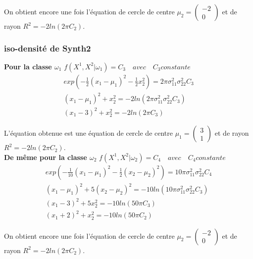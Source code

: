 \documentclass[10pt]{article}
\begin{document}
 On obtient encore une fois l'équation de cercle de centre $\mu_{2} = \begin{pmatrix} -2 \\ 0\end{pmatrix} $ et de rayon $R^{2} = -2 ln(2\pi C_{2})$.\\


\subsubsection{iso-densité de Synth2}
\textbf{Pour la classe $\omega_{1}$} $f(X^{1}, X^{2}|\omega_{1}) = C_{3} \quad avec \quad C_{3} constante$
\begin{equation}
\begin{split}
exp(-\frac{1}{2} (x_{1}-\mu_{1})^{2} - \frac{1}{2}x_{2}^{2})  = 2 \pi \sigma_{11}^{2} \sigma_{22}^{2} C_{3}
\\
(x_{1} - \mu_{1})^{2} +  x_{2}^{2} = -2ln(2 \pi \sigma_{11}^{2} \sigma_{22}^{2} C_{3})
\\
(x_{1} - 3)^{2} + x_{2}^{2} = -2 ln(2\pi C_{3})
\end{split}
\label{9}
\end{equation}

L'équation obtenue est une équation de cercle de centre $\mu_{1} = \begin{pmatrix} 3 \\ 1\end{pmatrix} $ et de rayon $R^{2} = -2 ln(2\pi C_{2})$.\\

\textbf{De même pour la classe $\omega_{2}$} $f(X^{1}, X^{2}|\omega_{2}) = C_{4} \quad avec \quad C_{4} constante$
\begin{equation}
\begin{split}
exp(-\frac{1}{10} (x_{1}-\mu_{1})^{2} - \frac{1}{2}(x_{2}-\mu_{2})^{2})  = 10 \pi \sigma_{11}^{2} \sigma_{22}^{2} C_{4}
\\
(x_{1} - \mu_{1})^{2} +  5(x_{2}-\mu_{2})^{2}  = -10ln(10 \pi \sigma_{11}^{2} \sigma_{22}^{2} C_{3})
\\
(x_{1} - 3)^{2} + 5x_{2}^{2} = -10 ln(50\pi C_{3})
\\
(x_{1} + 2)^{2} + x_{2}^{2} = -10ln(50\pi C_{2})
\label{10}
\end{split}
\end{equation}

On obtient encore une fois l'équation de cercle de centre $\mu_{2} = \begin{pmatrix} -2 \\ 0\end{pmatrix} $ et de rayon $R^{2} = -2 ln(2\pi C_{2})$.\\
\end{document}
